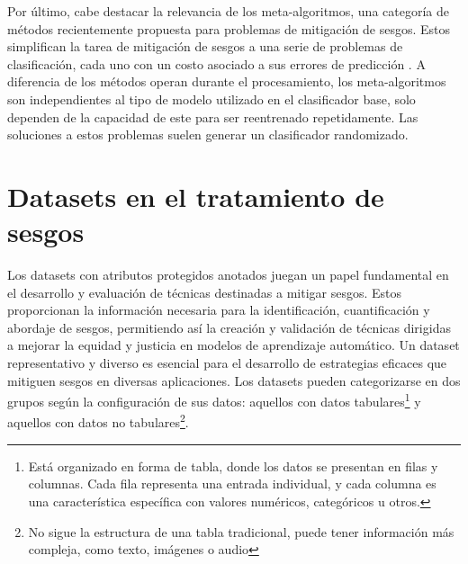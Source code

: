 Por \'ultimo, cabe destacar la relevancia de los meta-algoritmos, una categor\'ia de m\'etodos recientemente propuesta para problemas de 
mitigaci\'on de sesgos. Estos simplifican la tarea de mitigaci\'on de sesgos a una serie de problemas de clasificaci\'on, cada uno con 
un costo asociado a sus errores de predicci\'on \parencite{agarwal2018reductions, agarwal2019fair}.
A diferencia de los m\'etodos operan durante el procesamiento, los meta-algoritmos son independientes al tipo de modelo utilizado en el 
clasificador base, solo dependen de la capacidad de este para ser reentrenado repetidamente. Las soluciones a estos problemas suelen generar
un clasificador randomizado.

\section{Datasets en el tratamiento de sesgos}

    Los datasets con atributos protegidos anotados juegan un papel fundamental en el desarrollo y evaluaci\'on de t\'ecnicas destinadas 
    a mitigar sesgos. Estos proporcionan la informaci\'on necesaria para la identificaci\'on, cuantificaci\'on y abordaje de sesgos, 
    permitiendo as\'i la creaci\'on y validaci\'on de t\'ecnicas dirigidas a mejorar la equidad y justicia en modelos de aprendizaje 
    autom\'atico. 
    Un dataset representativo y diverso es esencial para el desarrollo de estrategias eficaces que mitiguen sesgos en diversas aplicaciones. 
    Los datasets pueden categorizarse en dos grupos seg\'un la configuraci\'on de sus datos: 
    aquellos con datos tabulares\footnote{Est\'a organizado en forma de tabla, donde los datos se presentan en filas y columnas. Cada fila 
    representa una entrada individual, y cada columna es una caracter\'istica espec\'ifica con valores num\'ericos, categ\'oricos u otros.} 
    y aquellos con datos no tabulares\footnote{No sigue la estructura de una tabla tradicional, puede tener informaci\'on m\'as compleja, como 
    texto, im\'agenes o audio}.
    
